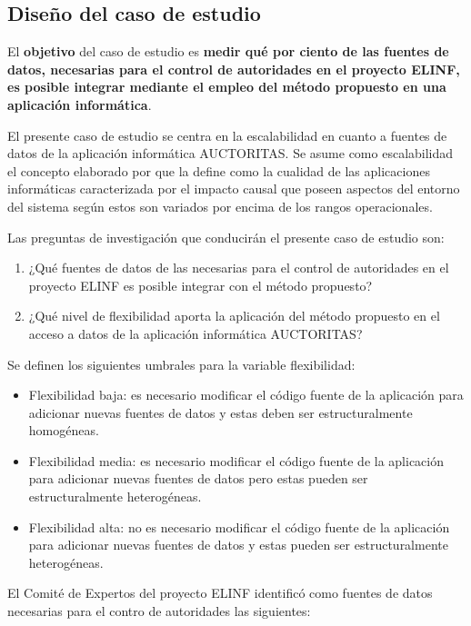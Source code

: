 \subsection{Diseño del caso de estudio}
El \textbf{objetivo} del caso de estudio es \textbf{medir qué por ciento de las fuentes de datos, necesarias para el control de autoridades en el proyecto ELINF, es posible integrar mediante el empleo del método propuesto en una aplicación informática}. 

El presente caso de estudio se centra en la escalabilidad en cuanto a fuentes de datos de la aplicación informática AUCTORITAS. Se asume como escalabilidad el concepto elaborado por \cite{duboc2006framework} que la define como la cualidad de las aplicaciones informáticas caracterizada por el impacto causal que poseen aspectos del entorno del sistema según estos son variados por encima de los rangos operacionales.

Las preguntas de investigación que conducirán el presente caso de estudio son:

\begin{enumerate}
\item ¿Qué fuentes de datos de las necesarias para el control de autoridades en el proyecto ELINF es posible integrar con el método propuesto?
\item ¿Qué nivel de flexibilidad aporta la aplicación del método propuesto en el acceso a datos de la aplicación informática AUCTORITAS?
\end{enumerate}

Se definen los siguientes umbrales para la variable flexibilidad:

\begin{itemize}
\item Flexibilidad baja: es necesario modificar el código fuente de la aplicación para adicionar nuevas fuentes de datos y estas deben ser estructuralmente homogéneas.
\item Flexibilidad media: es necesario modificar el código fuente de la aplicación para adicionar nuevas fuentes de datos pero estas pueden ser estructuralmente heterogéneas.
\item Flexibilidad alta: no es necesario modificar el código fuente de la aplicación para adicionar nuevas fuentes de datos y estas pueden ser estructuralmente heterogéneas.
\end{itemize}

El Comité de Expertos del proyecto ELINF identificó como fuentes de datos necesarias para el contro de autoridades las siguientes:

